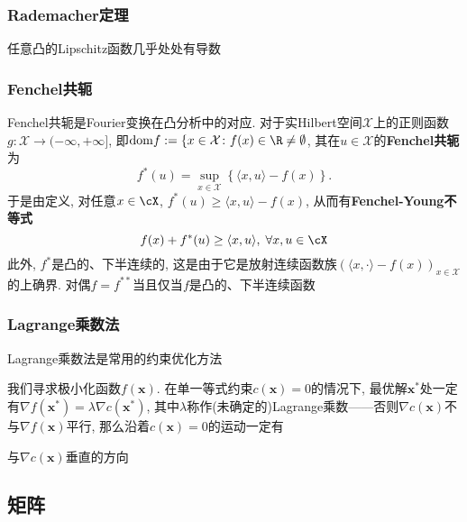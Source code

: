 \subsubsection{Rademacher定理}

\begin{theorem}[Rademacher]\label{thm:Rademacher}
	任意凸的Lipschitz函数几乎处处有导数
\end{theorem}


\subsubsection{Fenchel共轭}

Fenchel共轭是Fourier变换在凸分析中的对应. 
对于实Hilbert空间$\mathcal{X}$上的正则函数$g \colon \mathcal{X} \to (-\infty, +\infty]$, 即$\mathrm{dom} f := \{x \in \mathcal{X} \colon f(x) \in \R \neq \emptyset$, 其在$u \in \mathcal{X}$的\textbf{Fenchel共轭}为
\begin{equation}
	f^*(u) = \sup_{x \in \mathcal{X}} \left\{ \langle x, u \rangle - f(x) \right\}. 
\end{equation}
于是由定义, 对任意$x \in \cX$, $f^*(u) \geq \langle x, u \rangle - f(x)$, 从而有\textbf{Fenchel-Young不等式}
\begin{equation}
	f(x) + f^*(u) \geq \langle x, u \rangle,\; \forall x, u \in \cX
\end{equation}
此外, $f^*$是凸的、下半连续的, 这是由于它是放射连续函数族$(\langle x, \cdot \rangle - f(x))_{x \in \mathcal{X}}$的上确界. 
对偶$f = f^{**}$当且仅当$f$是凸的、下半连续函数

\subsubsection{Lagrange乘数法}

Lagrange乘数法是常用的约束优化方法\cite{burges:2004a}

我们寻求极小化函数$f(\bm{x})$. 
在单一等式约束$c(\bm{x}) = 0$的情况下, 最优解$\bm{x}^*$处一定有$\nabla f(\bm{x}^*) = \lambda \nabla c(\bm{x}^*)$, 其中$\lambda$称作(未确定的)Lagrange乘数——否则$\nabla c(\bm{x})$不与$\nabla f(\bm{x})$平行, 那么沿着$c(\bm{x}) = 0$的运动一定有

与$\nabla c(\bm{x})$垂直的方向



\subsection{矩阵}

